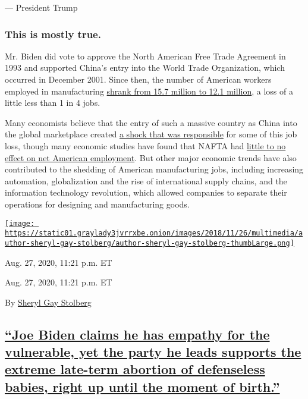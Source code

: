 --- President Trump

\hypertarget{this-is-mostly-true-1}{%
\subsubsection{This is mostly true.}\label{this-is-mostly-true-1}}

Mr. Biden did vote to approve the North American Free Trade Agreement in
1993 and supported China's entry into the World Trade Organization,
which occurred in December 2001. Since then, the number of American
workers employed in manufacturing
\href{https://slack-redir.net/link?url=https\%3A\%2F\%2Fwww.bls.gov\%2Fiag\%2Ftgs\%2Fiag31-33.htm}{shrank
from 15.7 million to 12.1 million}, a loss of a little less than 1 in 4
jobs.

Many economists believe that the entry of such a massive country as
China into the global marketplace created
\href{https://slack-redir.net/link?url=https\%3A\%2F\%2Fchinashock.info\%2Fpapers\%2F}{a
shock that was responsible} for some of this job loss, though many
economic studies have found that NAFTA had
\href{https://slack-redir.net/link?url=https\%3A\%2F\%2Ffas.org\%2Fsgp\%2Fcrs\%2Frow\%2FR42965.pdf}{little
to no effect on net American employment}. But other major economic
trends have also contributed to the shedding of American manufacturing
jobs, including increasing automation, globalization and the rise of
international supply chains, and the information technology revolution,
which allowed companies to separate their operations for designing and
manufacturing goods.

\href{https://www.nytimes3xbfgragh.onion/by/sheryl-gay-stolberg}{\texttt{[image: https://static01.graylady3jvrrxbe.onion/images/2018/11/26/multimedia/author-sheryl-gay-stolberg/author-sheryl-gay-stolberg-thumbLarge.png]}}

Aug. 27, 2020, 11:21 p.m. ET

Aug. 27, 2020, 11:21 p.m. ET

By
\href{https://www.nytimes3xbfgragh.onion/by/sheryl-gay-stolberg}{Sheryl
Gay Stolberg}

\hypertarget{joe-biden-claims-he-has-empathy-for-the-vulnerable-yet-the-party-he-leads-supports-the-extreme-late-term-abortion-of-defenseless-babies-right-up-until-the-moment-of-birth}{%
\subsection{\texorpdfstring{\protect\hyperlink{joe-biden-claims-he-has-empathy-for-the-vulnerable-yet-the-party-he-leads-supports-the-extreme-late-term-abortion-of-defenseless}{``Joe
Biden claims he has empathy for the vulnerable, yet the party he leads
supports the extreme late-term abortion of defenseless babies, right up
until the moment of
birth.''}}{``Joe Biden claims he has empathy for the vulnerable, yet the party he leads supports the extreme late-term abortion of defenseless babies, right up until the moment of birth.''}}\label{joe-biden-claims-he-has-empathy-for-the-vulnerable-yet-the-party-he-leads-supports-the-extreme-late-term-abortion-of-defenseless-babies-right-up-until-the-moment-of-birth}}

